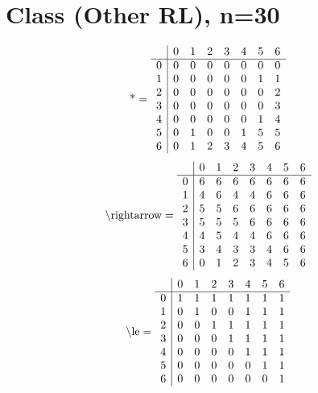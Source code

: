 \documentclass[11pt]{article}
\begin{document}
\section{Class (Other RL), n=30}
\[\text{*} = 
\begin{array}{r | r r r r r r r}
 & 0 & 1 & 2 & 3 & 4 & 5 & 6 \\ \hline
0 & 0 & 0 & 0 & 0 & 0 & 0 & 0 \\
1 & 0 & 0 & 0 & 0 & 0 & 1 & 1 \\
2 & 0 & 0 & 0 & 0 & 0 & 0 & 2 \\
3 & 0 & 0 & 0 & 0 & 0 & 0 & 3 \\
4 & 0 & 0 & 0 & 0 & 0 & 1 & 4 \\
5 & 0 & 1 & 0 & 0 & 1 & 5 & 5 \\
6 & 0 & 1 & 2 & 3 & 4 & 5 & 6 \\
\end{array}
\]
\[\text{\textbackslash rightarrow} = 
\begin{array}{r | r r r r r r r}
 & 0 & 1 & 2 & 3 & 4 & 5 & 6 \\ \hline
0 & 6 & 6 & 6 & 6 & 6 & 6 & 6 \\
1 & 4 & 6 & 4 & 4 & 6 & 6 & 6 \\
2 & 5 & 5 & 6 & 6 & 6 & 6 & 6 \\
3 & 5 & 5 & 5 & 6 & 6 & 6 & 6 \\
4 & 4 & 5 & 4 & 4 & 6 & 6 & 6 \\
5 & 3 & 4 & 3 & 3 & 4 & 6 & 6 \\
6 & 0 & 1 & 2 & 3 & 4 & 5 & 6 \\
\end{array}
\]
\[\text{\textbackslash le} = 
\begin{array}{r | r r r r r r r}
 & 0 & 1 & 2 & 3 & 4 & 5 & 6 \\ \hline
0 & 1 & 1 & 1 & 1 & 1 & 1 & 1 \\
1 & 0 & 1 & 0 & 0 & 1 & 1 & 1 \\
2 & 0 & 0 & 1 & 1 & 1 & 1 & 1 \\
3 & 0 & 0 & 0 & 1 & 1 & 1 & 1 \\
4 & 0 & 0 & 0 & 0 & 1 & 1 & 1 \\
5 & 0 & 0 & 0 & 0 & 0 & 1 & 1 \\
6 & 0 & 0 & 0 & 0 & 0 & 0 & 1 \\
\end{array}
\]
\end{document}
